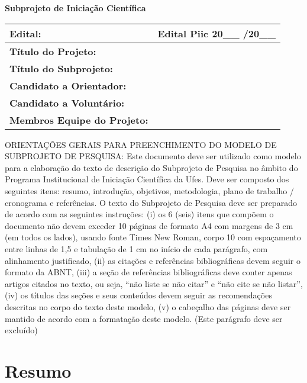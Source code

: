 \documentclass[10pt, a4paper]{article}
\begin{document}
\afterpage{\cfoot{\thepage}}



\begin{center}
 {\Large \bf  Subprojeto de Iniciação Científica}
 \end{center}

\vspace{.5cm}


\begin{tabularx}{\textwidth}{|l|X|}
\hline
{\bf Edital:} & Edital Piic 20\_\_ /20\_\_ \\
\hline
{\bf Título do Projeto:} &  \\
\hline
{\bf Título do Subprojeto:} &  \\
\hline
{\bf Candidato a Orientador:}&   \\
\hline
{\bf Candidato a Voluntário:} &   \\
\hline
{\bf Membros Equipe do Projeto:} &  \\
\hline  
\end{tabularx}

\vspace{.5cm}


ORIENTAÇÕES GERAIS PARA PREENCHIMENTO DO MODELO DE SUBPROJETO DE PESQUISA: Este documento deve ser utilizado como modelo para a elaboração do texto de descrição do Subprojeto de Pesquisa no âmbito do Programa Institucional de Iniciação Científica da Ufes. Deve ser composto dos seguintes itens: resumo, introdução, objetivos, metodologia, plano de trabalho / cronograma e referências. O texto do Subprojeto de Pesquisa deve ser preparado de acordo com as seguintes instruções: (i) os 6 (seis) itens que compõem o documento não devem exceder 10 páginas de formato A4 com margens de 3 cm (em todos os lados), usando fonte Times New Roman, corpo 10 com espaçamento entre linhas de 1,5 e tabulação de 1 cm no início de cada parágrafo, com alinhamento justificado, (ii) as citações e referências bibliográficas devem seguir o formato da ABNT, (iii) a seção de referências bibliográficas deve conter apenas artigos citados no texto, ou seja, “não liste se não citar” e “não cite se não listar”, (iv) os títulos das seções e seus conteúdos devem seguir as recomendações descritas no corpo do texto deste modelo, (v) o cabeçalho das páginas deve ser mantido de acordo com a formatação deste modelo. (Este parágrafo deve ser excluído)


\section{Resumo}
\end{document}
